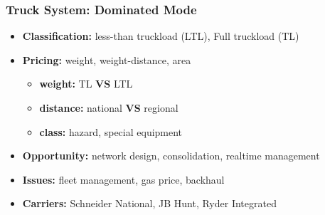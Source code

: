 \documentclass[10pt,presentation]{beamer}
\begin{document}
\begin{frame}
  \frametitle{Truck System: Dominated Mode}

  \begin{itemize}
    \item \textbf{Classification:} less-than truckload (LTL), Full truckload (TL)
    \item \textbf{Pricing:} weight, weight-distance, area
    \begin{itemize}
      \item \textbf{weight:} TL \textbf{VS} LTL
      \item \textbf{distance:} national \textbf{VS} regional
      \item \textbf{class:} hazard, special equipment
    \end{itemize}
    \item \textbf{Opportunity:} \alert{network design}, consolidation, realtime management
    \item \textbf{Issues:} \alert{fleet management}, gas price, backhaul
    \item \textbf{Carriers:} Schneider National, JB Hunt, Ryder Integrated
  \end{itemize}

  \end{frame}
\end{document}
